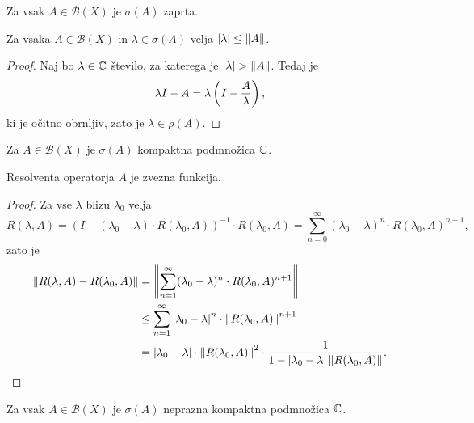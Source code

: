 \begin{posledica}
Za vsak $A \in \mathcal{B}(X)$ je $\sigma(A)$ zaprta.
\end{posledica}

\begin{trditev}
Za vsaka $A \in \mathcal{B}(X)$ in $\lambda \in \sigma(A)$ velja
$\left\lvert \lambda\right\rvert \leq \left\lVert A\right\rVert$.
\end{trditev}

\begin{proof}
Naj bo $\lambda \in \mathbb{C}$ število, za katerega je
$\left\lvert \lambda\right\rvert > \left\lVert A\right\rVert$. Tedaj je
\[
\lambda I - A = \lambda \left(I - \frac{A}{\lambda}\right),
\]
ki je očitno obrnljiv, zato je $\lambda \in \rho(A)$.
\end{proof}

\begin{posledica}
Za $A \in \mathcal{B}(X)$ je $\sigma(A)$ kompaktna podmnožica $\mathbb{C}$.
\end{posledica}

\begin{trditev}
Resolventa operatorja $A$ je zvezna funkcija.
\end{trditev}

\begin{proof}
Za vse $\lambda$ blizu $\lambda_0$ velja
\[
R(\lambda, A) =
(I - (\lambda_0 - \lambda) \cdot R(\lambda_0, A))^{-1} \cdot
R(\lambda_0, A) =
\sum_{n=0}^\infty (\lambda_0 - \lambda)^n \cdot
R(\lambda_0, A)^{n+1},
\]
zato je
\begin{align*}
\left\lVert R(\lambda, A) - R(\lambda_0, A)\right\rVert &=
\left\lVert \sum_{n=1}^\infty (\lambda_0 - \lambda)^n \cdot
R(\lambda_0, A)^{n+1}\right\rVert
\\
&\leq
\sum_{n=1}^\infty \left\lvert \lambda_0 - \lambda\right\rvert^n \cdot
\left\lVert R(\lambda_0, A)\right\rVert^{n+1}
\\
&=
\left\lvert \lambda_0 - \lambda\right\rvert \cdot \left\lVert R(\lambda_0, A)\right\rVert^2 \cdot
\frac{1}{1 - \left\lvert \lambda_0 - \lambda\right\rvert \left\lVert R(\lambda_0, A)\right\rVert}.
\qedhere
\end{align*}
\end{proof}

\begin{izrek}
Za vsak $A \in \mathcal{B}(X)$ je $\sigma(A)$ neprazna kompaktna
podmnožica $\mathbb{C}$.
\end{izrek}

